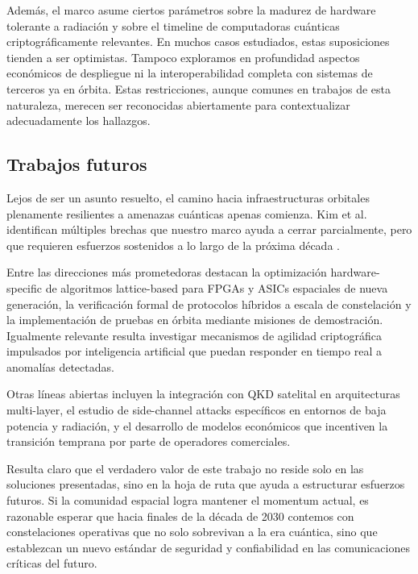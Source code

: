Además, el marco asume ciertos parámetros sobre la madurez de hardware tolerante a radiación y sobre el timeline de computadoras cuánticas criptográficamente relevantes. En muchos casos estudiados, estas suposiciones tienden a ser optimistas. Tampoco exploramos en profundidad aspectos económicos de despliegue ni la interoperabilidad completa con sistemas de terceros ya en órbita. Estas restricciones, aunque comunes en trabajos de esta naturaleza, merecen ser reconocidas abiertamente para contextualizar adecuadamente los hallazgos.

\subsection{Trabajos futuros}

Lejos de ser un asunto resuelto, el camino hacia infraestructuras orbitales plenamente resilientes a amenazas cuánticas apenas comienza. Kim et al. identifican múltiples brechas que nuestro marco ayuda a cerrar parcialmente, pero que requieren esfuerzos sostenidos a lo largo de la próxima década \cite{Kim2026}.

Entre las direcciones más prometedoras destacan la optimización hardware-specific de algoritmos lattice-based para FPGAs y ASICs espaciales de nueva generación, la verificación formal de protocolos híbridos a escala de constelación y la implementación de pruebas en órbita mediante misiones de demostración. Igualmente relevante resulta investigar mecanismos de agilidad criptográfica impulsados por inteligencia artificial que puedan responder en tiempo real a anomalías detectadas.

Otras líneas abiertas incluyen la integración con QKD satelital en arquitecturas multi-layer, el estudio de side-channel attacks específicos en entornos de baja potencia y radiación, y el desarrollo de modelos económicos que incentiven la transición temprana por parte de operadores comerciales. 

Resulta claro que el verdadero valor de este trabajo no reside solo en las soluciones presentadas, sino en la hoja de ruta que ayuda a estructurar esfuerzos futuros. Si la comunidad espacial logra mantener el momentum actual, es razonable esperar que hacia finales de la década de 2030 contemos con constelaciones operativas que no solo sobrevivan a la era cuántica, sino que establezcan un nuevo estándar de seguridad y confiabilidad en las comunicaciones críticas del futuro.